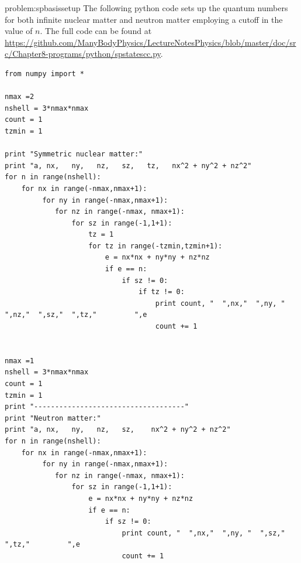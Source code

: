   \begin{sol}{problem:spbasissetup}
  The following python code sets up the quantum numbers for both
  infinite nuclear matter and neutron matter employing a cutoff in
  the value of $n$. The full code can be found at  \url{https://github.com/ManyBodyPhysics/LectureNotesPhysics/blob/master/doc/src/Chapter8-programs/python/spstatescc.py}.
  \begin{lstlisting}
from numpy import *

nmax =2
nshell = 3*nmax*nmax
count = 1
tzmin = 1

print "Symmetric nuclear matter:"  
print "a, nx,   ny,   nz,   sz,   tz,   nx^2 + ny^2 + nz^2"
for n in range(nshell): 
    for nx in range(-nmax,nmax+1):
         for ny in range(-nmax,nmax+1):
            for nz in range(-nmax, nmax+1):  
                for sz in range(-1,1+1):
                    tz = 1
                    for tz in range(-tzmin,tzmin+1):
                        e = nx*nx + ny*ny + nz*nz
                        if e == n:
                            if sz != 0: 
                                if tz != 0: 
                                    print count, "  ",nx,"  ",ny, "  ",nz,"  ",sz,"  ",tz,"         ",e
                                    count += 1
                                    
                                    
nmax =1
nshell = 3*nmax*nmax
count = 1
tzmin = 1
print "------------------------------------"
print "Neutron matter:"                                    
print "a, nx,   ny,   nz,   sz,    nx^2 + ny^2 + nz^2"
for n in range(nshell): 
    for nx in range(-nmax,nmax+1):
         for ny in range(-nmax,nmax+1):
            for nz in range(-nmax, nmax+1):  
                for sz in range(-1,1+1):
                    e = nx*nx + ny*ny + nz*nz
                    if e == n:
                        if sz != 0: 
                            print count, "  ",nx,"  ",ny, "  ",sz,"  ",tz,"         ",e
                            count += 1     
  \end{lstlisting}                               
  \end{sol}






